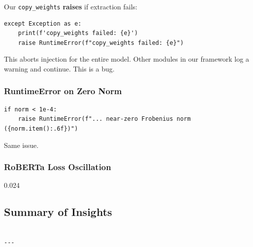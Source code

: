 Our \texttt{copy\_weights} \textbf{raises} if extraction fails:

\begin{lstlisting}
except Exception as e:
    print(f'copy_weights failed: {e}')
    raise RuntimeError(f"copy_weights failed: {e}")
\end{lstlisting}

This aborts injection for the entire model. Other modules in our framework 
log a warning and continue. This is a bug.

\subsubsection{RuntimeError on Zero Norm}

\begin{lstlisting}
if norm < 1e-4:
    raise RuntimeError(f"... near-zero Frobenius norm ({norm.item():.6f})")
\end{lstlisting}

Same issue.

\subsubsection{RoBERTa Loss Oscillation}

0.024

\subsection{Summary of Insights}

\begin{lstlisting}

---
\end{lstlisting}